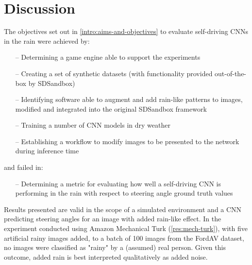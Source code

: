 \chapter{Discussion}
\label{Discussion} 


The objectives set out in \ref{intro:aims-and-objectives} to evaluate self-driving CNNs in the rain were achieved by:
\begin{itemize}
    \item  [--] Determining a game engine able to support the experiments
    \item  [--] Creating a set of synthetic datasets (with functionality provided out-of-the-box by SDSandbox)
    \item  [--] Identifying software able to augment and add rain-like patterns to images, modified and integrated into the original SDSandbox framework
    \item  [--] Training a number of CNN models in dry weather
    \item  [--] Establishing a workflow to modify images to be presented to the network during inference time
\end{itemize}
and failed in:
\begin{itemize}
    \item  [--] Determining a metric for evaluating how well a self-driving CNN is performing in the rain with respect to steering angle ground truth values
\end{itemize}

Results presented are valid in the scope of a simulated environment and a CNN predicting steering angles for an image with added rain-like effect. In the experiment conducted using Amazon Mechanical Turk (\ref{res:mech-turk}), with five artificial rainy images added, to a batch of 100 images from the FordAV dataset, no images were classified as "rainy" by a (assumed) real person. Given this outcome, added rain is best interpreted qualitatively as added noise.  

